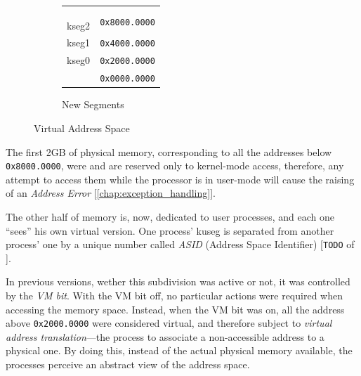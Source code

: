 \documentclass[12pt,a4paper,openright,twoside]{report}
\begin{document}
\begin{figure}[h]
\begin{subfigure}[b]{0.4\textwidth}
\begin{tabular}{cl}
			\multicolumn{1}{|c|}{}                       & \multirow{2}{*}{}                     \\
			\multicolumn{1}{|c|}{}                       &                                       \\
			\multicolumn{1}{|c|}{}                       & \multirow{2}{*}{\texttt{0x8000.0000}} \\ \cline{1-1}
			\multicolumn{1}{|c|}{\multirow{4}{*}{kseg2}} &                                       \\
			\multicolumn{1}{|c|}{}                       & \multirow{2}{*}{}                     \\
			\multicolumn{1}{|c|}{}                       &                                       \\
			\multicolumn{1}{|c|}{}                       & \multirow{2}{*}{\texttt{0x4000.0000}} \\ \cline{1-1}
			\multicolumn{1}{|c|}{\multirow{2}{*}{kseg1}} &                                       \\
			\multicolumn{1}{|c|}{}                       & \multirow{2}{*}{\texttt{0x2000.0000}} \\ \cline{1-1}
			\multicolumn{1}{|c|}{\multirow{2}{*}{kseg0}} &                                       \\
			\multicolumn{1}{|c|}{}                       & \multirow{2}{*}{\texttt{0x0000.0000}} \\ \cline{1-1}
			\multicolumn{1}{l}{}                         &
		\end{tabular}
		\caption{New Segments}
		\label{fig:new_segments}
	\end{subfigure}
	\caption{Virtual Address Space}
	\label{fig:virtual_address_space}
\end{figure}

The first 2GB of physical memory, corresponding to all the addresses below \texttt{0x8000.0000}, were and are reserved only to kernel-mode access, therefore, any attempt to access them while the processor is in user-mode will cause the raising of an \textit{Address Error} [\autoref{chap:exception_handling}].

The other half of memory is, now, dedicated to user processes, and each one ``sees'' his own virtual version.
One process' kuseg is separated from another process' one by a unique number called \textit{ASID} (Address Space Identifier) [\texttt{TODO} of \cite{pops}].

In previous versions, wether this subdivision was active or not, it was controlled by the \textit{VM bit}.
With the VM bit off, no particular actions were required when accessing the memory space.
Instead, when the VM bit was on, all the address above \texttt{0x2000.0000} were considered virtual, and therefore subject to \textit{virtual address translation}---the process to associate a non-accessible address to a physical one.
By doing this, instead of the actual physical memory available, the processes perceive an abstract view of the address space.
\end{document}
